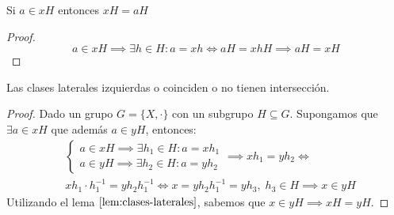 \begin{lem}
    Si $a \in xH$ entonces $xH = aH$
\end{lem}

\begin{proof}
    \begin{equation}
        a \in xH \implies \exists h \in H : a = xh \iff aH = xhH \implies aH = xH
    \end{equation}
    \label{lem:clases-laterales}
\end{proof}

\begin{thm}
    Las clases laterales izquierdas o coinciden o no tienen intersección.
    \label{thm:clases-laterales}
\end{thm}


\begin{proof}
    Dado un grupo $G=\{X, \cdot\}$ con un subgrupo $H \subseteq G$.
    Supongamos que $\exists a \in xH$ que además $a \in yH$, entonces:
    \begin{equation}
        \begin{split}
        & \begin{cases}
            a \in xH \implies \exists h_{1} \in H : a = xh_{1}\\
            a \in yH \implies \exists h_{2} \in H : a = yh_{2}
        \end{cases} \implies xh_{1} = yh_{2} \iff\\
        & xh_{1}\cdot h_{1}^{-1} = yh_{2}h_1^{-1} \iff x = yh_{2}h_{1}^{-1} = yh_{3}, \; h_{3} \in H \implies x \in yH
        \end{split}
    \end{equation}
    Utilizando el lema $\ref{lem:clases-laterales}$, sabemos que $x \in yH \implies xH = yH$.
\end{proof}
